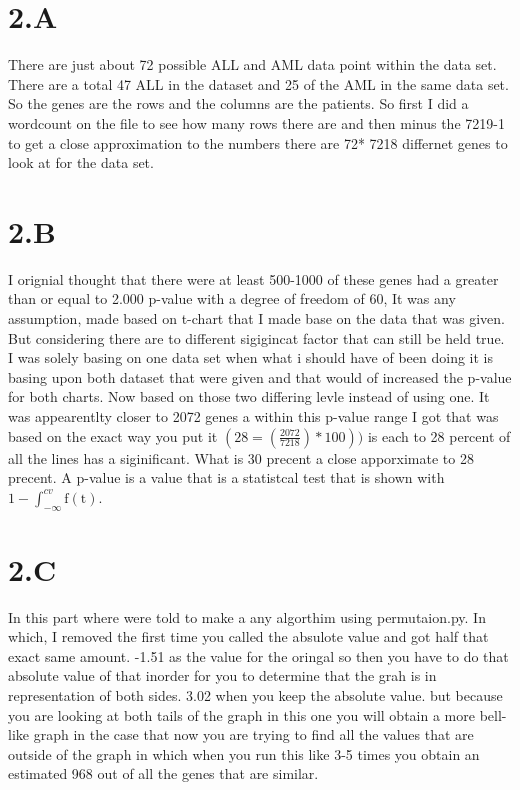 \documentclass[12pt]{article}
\begin{document}
\begin{itemize}
\part{2.A}
 There are just about 72 possible ALL and AML data point within the data set. There are a total 47 ALL in the dataset  and 25 of the AML in the same data set. So the genes are the rows and the columns are the patients. So first I did a wordcount on the file to see how many rows there are and then minus the 7219-1 to get a close approximation to the numbers there are 72* 7218 differnet genes to look at for the data set.

\part{2.B}
		I orignial thought that there were at least 500-1000 of these genes had a greater than or equal to 2.000 p-value with a degree of freedom of 60, It was any assumption, made based on t-chart that I made base on the data that was given. But considering there are to different sigigincat factor that can still be held true. I was solely basing on one data set when what i should have of been doing it is basing upon both dataset that were given and that would of increased the p-value for both charts. Now based on those two differing levle instead of using one. It was  appearentlty closer to 2072 genes a within this p-value range I got that was based on  the exact way you put it $(28=(\frac{2072}{7218})*100))$ is each to 28 percent of all the lines has a siginificant. What is 30 precent a close apporximate to 28 precent. A p-value is a value that is a statistcal test that is shown with $1 - \int_{-\infty}^{cv} \mathrm{f(t)}$. 

\part{2.C}
    In this part where were told to make a any algorthim using permutaion.py. In which, I removed the first time you called the absulote value and got half that exact same amount. -1.51 as the value for the oringal so then you have to do that absolute value of that inorder for you to determine that the grah is in representation of both sides. 3.02 when you keep the absolute value. but because you are looking at both tails of the graph in this one you will obtain a more bell-like graph in the case that now you are trying to find all the values that are outside of the graph in which when  you run this like 3-5 times you obtain an estimated 968 out of all the genes that are similar. 

\end{itemize}
\end{document}
